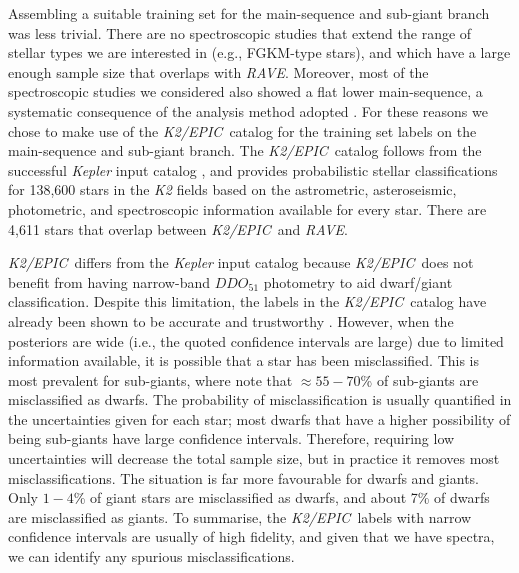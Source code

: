 \documentclass[preprint,trackchanges]{aastex}
\newcommand{\acronym}[1]{{\small{#1}}}
\newcommand{\project}[1]{\textsl{#1}}
\newcommand{\rave}{\project{\acronym{RAVE}}}
\newcommand{\epic}{\project{K2/EPIC}}
\begin{document}
Assembling a suitable training set for the main-sequence and sub-giant branch was less
trivial.  There are no spectroscopic studies that extend the range of stellar types we 
are interested in (e.g., FGKM-type stars), and which have a large enough sample size 
that overlaps with \rave.  Moreover, most of the spectroscopic studies we considered also 
showed a flat lower main-sequence, a systematic consequence of the analysis method adopted 
\citep[see][for discussion on this issue]{Bensby_2014}.  For these reasons we chose to make 
use of the \epic\ catalog \citep{Huber_2016} for the training set labels on the 
main-sequence and sub-giant branch.  The \epic\ catalog follows from the successful
\project{Kepler} input catalog \citep{Brown_2011}, and provides probabilistic stellar 
classifications for 138,600 stars in the \project{K2} fields based on the 
astrometric, asteroseismic, photometric, and spectroscopic information available for
every star.  There are 4,611 stars that overlap between \epic\ and \rave.


\epic\ differs from the \project{Kepler} input catalog because \epic\ does not 
benefit from having narrow-band $DDO_{51}$ photometry to aid dwarf/giant 
classification.  Despite this limitation, the labels in the \epic\ catalog have 
already been shown to be accurate and trustworthy \citep{Huber_2016}.  However, 
when the posteriors are wide (i.e., the quoted confidence intervals are large) 
due to limited information available, it is possible that a star has been 
misclassified.  This is most prevalent for sub-giants, where \citet{Huber_2016} 
note that $\approx55-70$\% of sub-giants are misclassified as dwarfs.  The 
probability of misclassification is usually quantified in the uncertainties given
for each star; most dwarfs that have a higher possibility of being sub-giants have
large confidence intervals.  Therefore, requiring low uncertainties will decrease 
the total sample size, but in practice it removes most misclassifications.  The 
situation is far more favourable for dwarfs and giants.  Only $1-4$\% of giant 
stars are misclassified as dwarfs, and about 7\% of dwarfs are misclassified as 
giants.  To summarise, the \epic\ labels with narrow confidence intervals are 
usually of high fidelity, and given that we have spectra, we can identify any
spurious misclassifications.
\end{document}
